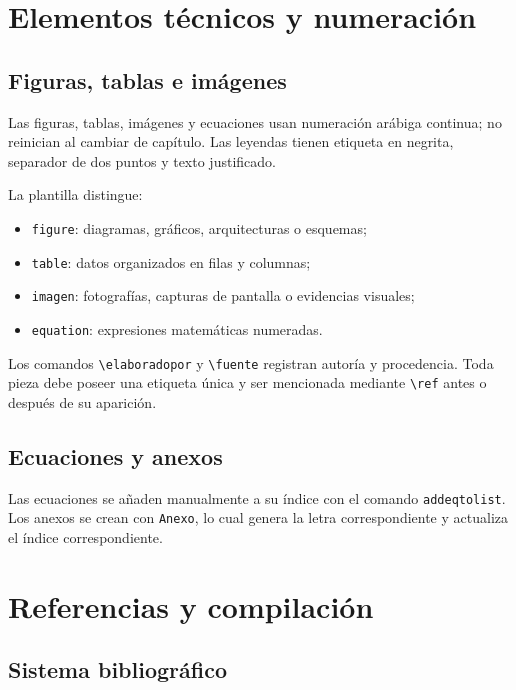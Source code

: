 \documentclass[12pt,a4paper,oneside]{report}
\begin{document}
\chapter{Elementos técnicos y numeración}

\section{Figuras, tablas e imágenes}

Las figuras, tablas, imágenes y ecuaciones usan numeración arábiga continua; no reinician al cambiar de capítulo. Las leyendas tienen etiqueta en negrita, separador de dos puntos y texto justificado.

La plantilla distingue:

\begin{itemize}
  \item \texttt{figure}: diagramas, gráficos, arquitecturas o esquemas;
  \item \texttt{table}: datos organizados en filas y columnas;
  \item \texttt{imagen}: fotografías, capturas de pantalla o evidencias visuales;
  \item \texttt{equation}: expresiones matemáticas numeradas.
\end{itemize}

Los comandos \texttt{\textbackslash elaboradopor} y \texttt{\textbackslash fuente} registran autoría y procedencia. Toda pieza debe poseer una etiqueta única y ser mencionada mediante \texttt{\textbackslash ref} antes o después de su aparición.

\section{Ecuaciones y anexos}

Las ecuaciones se añaden manualmente a su índice con el comando \texttt{addeqtolist}. Los anexos se crean con \texttt{Anexo}, lo cual genera la letra correspondiente y actualiza el índice correspondiente.

\chapter{Referencias y compilación}

\section{Sistema bibliográfico}
\end{document}
